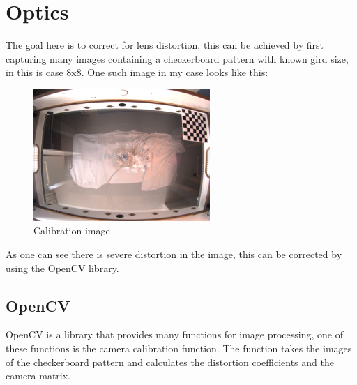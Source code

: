 \section{Optics}\label{sec:optics}
The goal here is to correct for lens distortion, this can be achieved by first capturing many images containing a checkerboard pattern with known gird size, in this is case 8x8.
One such image in my case looks like this:
\begin{figure}[H]
    \centering
    \includegraphics[height=5cm]{../photos/calibration_image}
    \caption[calimage]{Calibration image}
    \label{fig:calibration_image}
\end{figure}
As one can see there is severe distortion in the image, this can be corrected by using the OpenCV library.


\subsection{OpenCV}\label{subsec:opencv}
OpenCV is a library that provides many functions for image processing, one of these functions is the camera calibration function.
The function takes the images of the checkerboard pattern and calculates the distortion coefficients and the camera matrix.

